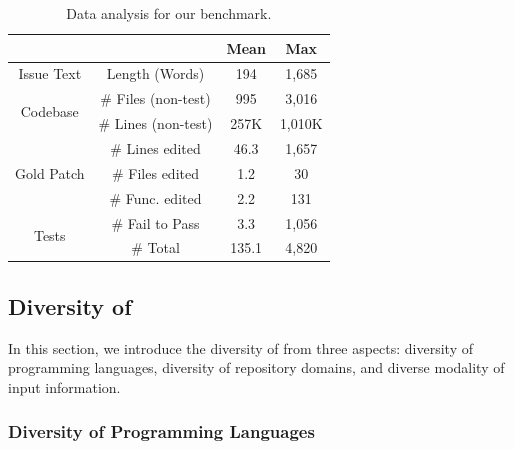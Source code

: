 \begin{table}[t]
\caption{Data analysis for our benchmark.} 
\label{table:dataAnalysis}
\tabmargin
\centering
\footnotesize
\begin{tabular}{cccc}
\toprule%
& &Mean&Max \\
\midrule
Issue Text&Length (Words)&194&1,685 \\
\midrule
\multirow{2}{*}{Codebase}&\# Files (non-test)&995&3,016 \\%
&\# Lines (non-test)&257K&1,010K \\
\midrule
\multirow{3}{*}{Gold Patch}&\# Lines edited& 46.3 & 1,657\\%
&\# Files edited&1.2&30 \\
&\# Func. edited&2.2&131 \\
\midrule
\multirow{2}{*}{Tests}&\# Fail to Pass&3.3&1,056 \\%
&\# Total&135.1&4,820 \\
\bottomrule
\end{tabular}
\end{table}



\subsection{Diversity of \Swebenchx}  
In this section, we introduce the diversity of \Swebenchx from three aspects: diversity of programming languages, diversity of repository domains, and diverse modality of input information. 


\subsubsection{Diversity of Programming Languages}

